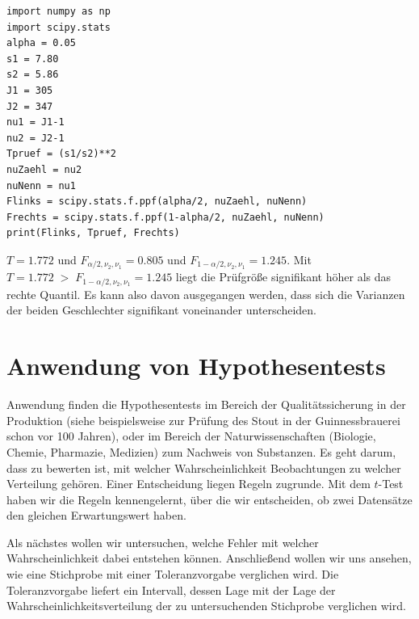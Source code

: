 \begin{lstlisting}[style=Python]
import numpy as np
import scipy.stats
alpha = 0.05
s1 = 7.80
s2 = 5.86
J1 = 305
J2 = 347
nu1 = J1-1
nu2 = J2-1
Tpruef = (s1/s2)**2
nuZaehl = nu2
nuNenn = nu1
Flinks = scipy.stats.f.ppf(alpha/2, nuZaehl, nuNenn)
Frechts = scipy.stats.f.ppf(1-alpha/2, nuZaehl, nuNenn)
print(Flinks, Tpruef, Frechts)
\end{lstlisting}
$T = 1.772$ und $F_{\alpha/2, \nu_2, \nu_1} = 0.805$ und
$F_{1-\alpha/2, \nu_2, \nu_1} = 1.245$. Mit $T = 1.772 \; > \; F_{1-\alpha/2, \nu_2, \nu_1} = 1.245$
liegt die Prüfgröße signifikant höher als das rechte Quantil.
Es kann also davon ausgegangen werden, dass sich die Varianzen der beiden Geschlechter signifikant voneinander unterscheiden.

\section{Anwendung von Hypothesentests}

Anwendung finden die Hypothesentests im Bereich der Qualitätssicherung in der Produktion (siehe beispielsweise
zur Prüfung des Stout in der Guinnessbrauerei schon vor 100 Jahren), oder im Bereich der Naturwissenschaften
(Biologie, Chemie, Pharmazie, Medizien) zum Nachweis von Substanzen. Es geht darum, dass zu bewerten ist,
mit welcher Wahrscheinlichkeit Beobachtungen zu welcher Verteilung gehören.
Einer Entscheidung liegen Regeln zugrunde. Mit dem $t$-Test haben wir die Regeln kennengelernt, über
die wir entscheiden, ob zwei Datensätze den gleichen Erwartungswert haben.

Als nächstes wollen wir untersuchen, welche Fehler mit welcher Wahrscheinlichkeit dabei entstehen können.
Anschließend wollen wir uns ansehen, wie eine Stichprobe mit einer Toleranzvorgabe verglichen wird.
Die Toleranzvorgabe liefert ein Intervall, dessen Lage mit der Lage der Wahrscheinlichkeitsverteilung
der zu untersuchenden Stichprobe verglichen wird.

